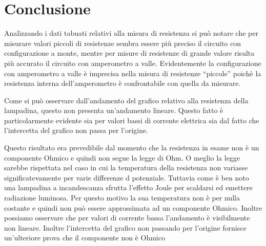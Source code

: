 \section*{Conclusione}

Analizzando i dati tabuati relativi alla misura di resistenza si può notare che per misurare valori piccoli di resistenze sembra essere più preciso il circuito con configurazione a monte, mentre per misure di resistenze di grande valore risulta più accurato il circuito con amperometro a valle.
Evidentemente la configurazione con amperometro a valle è imprecisa nella misura di resistenze ``piccole'' poichè la resistenza interna dell'amperometro è confrontabile con quella da misurare.

Come si può osservare dall'andamento del grafico relativo alla resistenza della lampadina, questo non presenta un'andamento lineare.
Questo fatto è particolarmente evidente sia per valori bassi di corrente elettrica sia dal fatto che l'intercetta del grafico non passa per l'origine.

Questo risultato era prevedibile dal momento che la resistenza in esame non è un componente Ohmico e quindi non segue la legge di Ohm.
O meglio la legge sarebbe rispettata nel caso in cui la temperatura della resistenza non variasse significatevamente per varie differenze d potenziale. Tuttavia come è ben noto una lampadina a incandescanza sfrutta l'effetto Joule per scaldarsi ed emettere radiazione luminosa. Per questo motivo la sua temperatura non è per nulla costante e quindi non può essere approssimata ad un componente Ohmico.
Inoltre possiamo osservare che per valori di corrente bassa l'andamento è visibilmente non lineare. Inoltre l'intercetta del grafico non passando per l'origine fornisce un'ulteriore prova che il componente non è Ohmico
